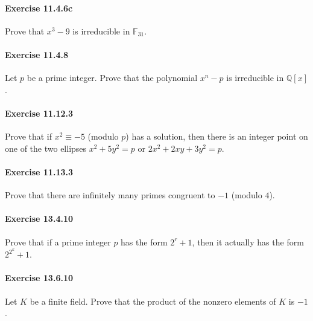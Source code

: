 \documentclass{article}
\begin{document}
\paragraph{Exercise 11.4.6c} Prove that $x^3 - 9$ is irreducible in $\mathbb{F}_{31}$.


\paragraph{Exercise 11.4.8} Let $p$ be a prime integer. Prove that the polynomial $x^n-p$ is irreducible in $\mathbb{Q}[x]$.


\paragraph{Exercise 11.12.3} Prove that if $x^2 \equiv-5$ (modulo $p$) has a solution, then there is an integer point on one of the two ellipses $x^2+5 y^2=p$ or $2 x^2+2 x y+3 y^2=p$.


\paragraph{Exercise 11.13.3} Prove that there are infinitely many primes congruent to $-1$ (modulo $4$).


\paragraph{Exercise 13.4.10} Prove that if a prime integer $p$ has the form $2^r+1$, then it actually has the form $2^{2^k}+1$.


\paragraph{Exercise 13.6.10} Let $K$ be a finite field. Prove that the product of the nonzero elements of $K$ is $-1$.
\end{document}
